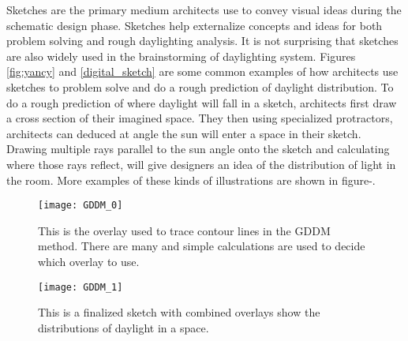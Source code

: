   Sketches are the primary medium architects use to convey visual ideas during the schematic design phase.
  Sketches help externalize concepts and ideas for both problem solving and rough daylighting analysis\cite{Suwa,yancy}.
  It is not surprising that sketches are also widely used in the brainstorming of daylighting system.
  Figures \ref{fig:yancy} and \ref{digital_sketch} are some common examples of how architects use sketches to problem solve and do a rough prediction of daylight distribution.
  To do a rough prediction of where daylight will fall in a sketch, architects first draw a cross section of their imagined space.
  They then using specialized protractors, architects can deduced at angle the sun will enter a space in their sketch\cite{james1976sun}.
  Drawing multiple rays parallel to the sun angle onto the sketch and calculating where those rays reflect, will give designers an idea of the distribution of light in the room.
  More examples of these kinds of illustrations are shown in figure-\cite{geometry_sketch}. \\

  \begin{figure}[h]
    \centering
    \begin{minipage}[b]{0.4\textwidth}
      \centering
      \texttt{[image: GDDM\_0]}
      \caption{This is the overlay used to trace contour lines in the GDDM method. There are many and simple calculations are used to decide which overlay to use.}
      \label{fig:GDDM_0}
    \end{minipage}
    \hfill
    \begin{minipage}[b]{0.4\textwidth}
      \centering
      \texttt{[image: GDDM\_1]}
      \caption{This is a finalized sketch with combined overlays show the distributions of daylight in a space.}
      \label{fig:GDDM_1}
    \end{minipage}
  \end{figure}

